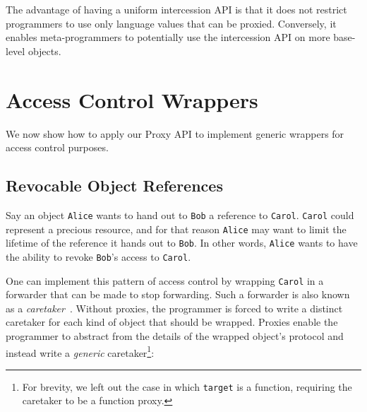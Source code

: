 \documentclass{sig-alternate}
\begin{document}
The advantage of having a uniform intercession API is that it does not restrict programmers to use only language values that can be proxied. Conversely, it enables meta-programmers to potentially use the intercession API on more base-level objects.


\section{Access Control Wrappers}
\label{sec:examples}

We now show how to apply our Proxy API to implement generic wrappers for access control purposes.

\subsection{Revocable Object References}
\label{sub:revoker}

Say an object \texttt{Alice} wants to hand out to \texttt{Bob} a reference to \texttt{Carol}. \texttt{Carol} could represent a precious resource, and for that reason \texttt{Alice} may want to limit the lifetime of the reference it hands out to \texttt{Bob}. In other words, \texttt{Alice} wants to have the ability to revoke \texttt{Bob}'s access to \texttt{Carol}.

One can implement this pattern of access control by wrapping \texttt{Carol} in a forwarder that can be made to stop forwarding. Such a forwarder is also known as a \emph{caretaker}~\cite{redell74naming}. Without proxies, the programmer is forced to write a distinct caretaker for each kind of object that should be wrapped. Proxies enable the programmer to abstract from the details of the wrapped object's protocol and instead write a \emph{generic} caretaker\footnote{For brevity, we left out the case in which \texttt{target} is a function, requiring the caretaker to be a function proxy.}:
\end{document}
